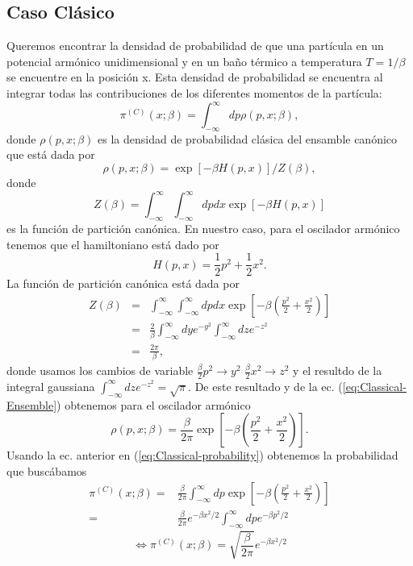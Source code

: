 \documentclass[%
 reprint,
 amsmath,amssymb,
 aps,
 pra,
]{revtex4-2}
\begin{document}
\subsection{Caso Clásico} \label{subsec:caso-clasico}
Queremos encontrar la densidad de probabilidad de que una partícula en un potencial armónico unidimensional y en un baño térmico a temperatura $T = 1/\beta$ se encuentre en la posición x. Esta densidad de probabilidad se encuentra al integrar todas las contribuciones de los diferentes momentos de la partícula:
\begin{equation}
	\pi^{(C)}(x;\beta) = \int_{-\infty}^\infty dp \rho(p,x;\beta),  \label{eq:Classical-probability}
\end{equation}
donde $\rho(p,x;\beta)$ es la densidad de probabilidad clásica del ensamble canónico que está dada por
\begin{equation}
	\rho(p,x;\beta) = \exp[-\beta H(p,x)] / Z(\beta) ,  \label{eq:Classical-Ensemble}
\end{equation}
donde
\begin{equation}
	Z(\beta) = \int_{-\infty}^\infty \int_{-\infty}^\infty dp dx \exp[-\beta H(p,x)]
\end{equation} 
es la función de partición canónica.
En nuestro caso, para el oscilador armónico tenemos que el hamiltoniano está dado por
\begin{equation}
	H(p,x) = \frac{1}{2} p^2 + \frac{1}{2} x^2. \label{eq:Classical-Hamiltonian}
\end{equation}
La función de partición canónica está dada por
\begin{eqnarray}
	Z(\beta) 	&=& \int_{-\infty}^\infty \int_{-\infty}^\infty dp dx \exp[-\beta \left( \frac{p^2}{2} + \frac{x^2}{2} \right) ] \\ 
				&=& \frac{2}{\beta} \int_{-\infty}^\infty dy e^{-y^2} \int_{-\infty}^\infty dz e^{-z^2} \nonumber \\
				&=& \frac{2\pi}{\beta},
\end{eqnarray}
donde usamos los cambios de variable $\frac{\beta}{2}p^2 \rightarrow y^2$ $\frac{\beta}{2}x^2 \rightarrow z^2$ y el resultdo de la integral gaussiana $\int_{-\infty}^\infty dz e^{-z^2} = \sqrt{\pi}$. De este resultado y de la ec. (\ref{eq:Classical-Ensemble}) obtenemos para el oscilador armónico
\begin{equation}
	\rho(p,x;\beta) = \frac{\beta}{2\pi} \exp[-\beta \left( \frac{p^2}{2} + \frac{x^2}{2} \right) ] \label{eq:HO-Classical-Ensemble}.
\end{equation}
Usando la ec. anterior en (\ref{eq:Classical-probability}) obtenemos la probabilidad que buscábamos 
\begin{align}
	\pi^{(C)}(x;\beta) =& \frac{\beta}{2\pi}\int_{-\infty}^\infty dp \exp[-\beta \left( \frac{p^2}{2} + \frac{x^2}{2} \right)] \nonumber \\
	=&\frac{\beta}{2\pi}e^{-\beta x^2/2}
	\int_{-\infty}^\infty dp e^{-\beta p^2/2} \nonumber
\end{align}
\begin{equation}
	\!\!\!\!\!\!\!\!\!\!\!\!\!\!\!\!\!\!\!\!\!\!\! \iff \pi^{(C)}(x;\beta) = \sqrt{\frac{\beta}{2\pi}}e^{-\beta x^2/2} \label{eq:pi-classical-finale}
\end{equation}
\end{document}

